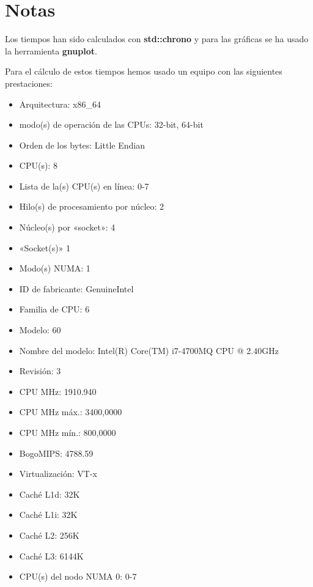 \documentclass{article}
\begin{document}
\section{Notas}
Los tiempos han sido calculados con {\bf std::chrono} y para las gráficas se ha usado la herramienta {\bf gnuplot}.
\

Para el cálculo de estos tiempos hemos usado un equipo con las siguientes prestaciones:
\begin{itemize}
	\item Arquitectura:                        x86\_64
	\item modo(s) de operación de las CPUs:    32-bit, 64-bit
	\item Orden de los bytes:                  Little Endian
	\item CPU(s):                              8
	\item Lista de la(s) CPU(s) en línea:      0-7
	\item Hilo(s) de procesamiento por núcleo: 2
	\item Núcleo(s) por «socket»:              4
	\item «Socket(s)»                          1
	\item Modo(s) NUMA:                        1
	\item ID de fabricante:                    GenuineIntel
	\item Familia de CPU:                      6
	\item Modelo:                              60
	\item Nombre del modelo:                   Intel(R) Core(TM) i7-4700MQ CPU @ 2.40GHz
	\item Revisión:                            3
	\item CPU MHz:                             1910.940
	\item CPU MHz máx.:                        3400,0000
	\item CPU MHz mín.:                        800,0000
	\item BogoMIPS:                            4788.59
	\item Virtualización:                      VT-x
	\item Caché L1d:                           32K
	\item Caché L1i:                           32K
	\item Caché L2:                            256K
	\item Caché L3:                            6144K
	\item CPU(s) del nodo NUMA 0:              0-7
\end{itemize}
\end{document}
